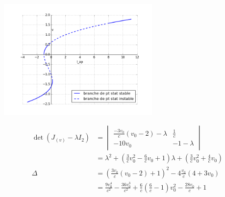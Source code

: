 \documentclass[xcolor={dvipsnames},10pt]{beamer}
\begin{document}
\begin{frame}
\begin{center}
\includegraphics[width=0.6\textwidth]{bif2.png}
\end{center}
\end{frame}



\begin{frame}
\begin{align*}
\det(J_{(v)} - \lambda I_2)&=
\begin{vmatrix}
{\frac{-3v_0}{c}(v_0-2) -\lambda} & {\frac{1}{c}} \\ -10v_0 & -1 - \lambda \end{vmatrix} \\
	 &= \lambda^2 + \left(\frac{3}{c}v_0^2-\frac{6}{c}v_0 + 1\right)\lambda + \left(\frac{3}{c}v_0^2 + \frac{4}{c}v_0\right)  \\
	 \Delta & =  \left(\frac{3v_0}{c}(v_0 - 2) + 1\right)^2 - 4\frac{v_0}{c}(4 + 3v_0) \\
	 & = \frac{9v_0^4}{c^2} - \frac{36v_0^3}{c^2} + \frac{6}{c}(\frac{6}{c} - 1)v_0^2 - \frac{28v_0}{c} + 1
\end{align*}
\end{frame}
\end{document}
